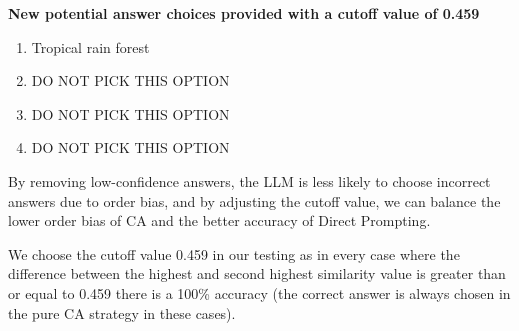 \vspace{0.5em}

\noindent\textbf{New potential answer choices provided with a cutoff value of 0.459}
\begin{enumerate}[label=\Alph*., itemsep=0pt, topsep=0pt]
    \item Tropical rain forest
    \item DO NOT PICK THIS OPTION
    \item DO NOT PICK THIS OPTION
    \item DO NOT PICK THIS OPTION
\end{enumerate}


By removing low-confidence answers, the LLM is less likely to choose incorrect answers due to order bias, and by adjusting the cutoff value, we can balance the lower order bias of CA and the better accuracy of Direct Prompting.

We choose the cutoff value 0.459 in our testing as in every case where the difference between the highest and second highest similarity value is greater than or equal to 0.459 there is a 100\% accuracy (the correct answer is always chosen in the pure CA strategy in these cases).

